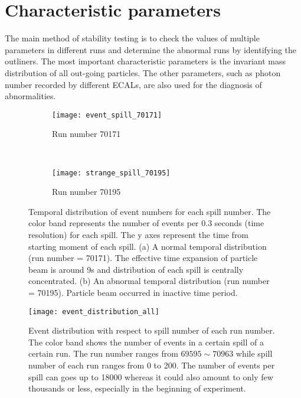 \section{Characteristic parameters}
The main method of stability testing is to check the values of multiple parameters in different runs and determine the abnormal runs by identifying the outliners. The most important characteristic parameters is the invariant mass distribution of all out-going particles. The other parameters, such as photon number recorded by different ECALs, are also used for the diagnosis of abnormalities.

\begin{figure*}[!ht]
	\centering
	\begin{subfigure}[b]{0.49\textwidth}
		\texttt{[image: event\_spill\_70171]}
		\caption{Run number 70171}
		\label{fig:EveN_spill_normal}
	\end{subfigure}
	~ %
	\begin{subfigure}[b]{0.49\textwidth}
		\texttt{[image: strange\_spill\_70195]}
		\caption{Run number 70195}
		\label{fig:EveN_spill_abnormal}
	\end{subfigure}
	\caption{Temporal distribution of event numbers for each spill number. The color band represents the number of events per 0.3 seconds (time resolution) for each spill. The y axes represent the time from starting moment of each spill. (a) A normal temporal distribution (run number = 70171). The effective time expansion of particle beam is around 9s and distribution of each spill is centrally concentrated. (b) An abnormal temporal distribution (run number = 70195). Particle beam occurred in inactive time period.}
	\label{fig:animals}
\end{figure*}

\begin{figure*}[!h]
	\centering
	\texttt{[image: event\_distribution\_all]}
	\caption{Event distribution with respect to spill number of each run number. The color band shows the number of events in a certain spill of a certain run. The run number ranges from $69595 \sim 70963$ while spill number of each run ranges from 0 to 200. The number of events per spill can goes up to 18000 whereas it could also amount to only few thousands or less, especially in the beginning of experiment. }
	\label{fig:event_distribution_all}
\end{figure*}


